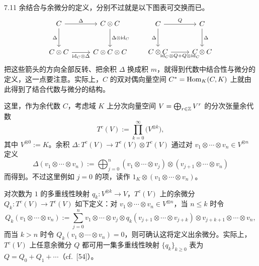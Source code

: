\begin{remark}{7.11}
余结合与余微分的定义，分别不过就是以下图表可交换而已。
\[
\begin{tikzcd}[row sep=2.6em, column sep=2.6em]
  C \arrow[r,"\Delta"] \arrow[d,"\Delta"'] & C\otimes C \arrow[d,"\Delta\otimes\id_{C}"] \\
  C\otimes C \arrow[r,"\id_{C}\otimes\Delta"'] & C\otimes C\otimes C
\end{tikzcd}
\qquad
\begin{tikzcd}[row sep=2.6em, column sep=2.6em]
  C \arrow[r,"Q"] \arrow[d,"\Delta"'] & C \arrow[d,"\Delta"] \\
  C\otimes C \arrow[r,"\id_{C}\otimes Q+Q\otimes\id_{C}"'] & C\otimes C
\end{tikzcd}
\]
把这些箭头的方向全部反转、把余积 $\Delta$ 换成积 $m$，就得到代数中结合性与微分的定义，这一点要注意。实际上，$C$ 的双对偶向量空间 $C^{*}=\operatorname{Hom}_{K}(C,K)$ 上就由此得到了结合代数与微分的结构。
\end{remark}

这里，作为余代数 $C$，考虑域 $K$ 上分次向量空间 $V=\bigoplus_{r\in\mathbb{Z}}V^{r}$ 的分次张量余代数
\[
  T^{c}(V):=\prod_{k=0}^{\infty}\bigl(V^{\otimes k}\bigr),
\]
其中 $V^{\otimes 0}:=K$。余积 $\Delta\colon T^{c}(V)\to T^{c}(V)\otimes T^{c}(V)$ 通过对 $v_{1}\otimes\cdots\otimes v_{n}\in V^{\otimes n}$ 定义
\[
  \Delta(v_{1}\otimes\cdots\otimes v_{n}):=\bigoplus_{j=0}^{n}(v_{1}\otimes\cdots\otimes v_{j})\otimes(v_{j+1}\otimes\cdots\otimes v_{n})
\]
而得到。不过这里例如 $j=0$ 的项，读作 $1_{K}\otimes(v_{1}\otimes\cdots\otimes v_{n})$。

对次数为 $1$ 的多重线性映射 $q_{k}\colon V^{\otimes k}\to V$，$T^{c}(V)$ 上的余微分 $Q_{k}\colon T^{c}(V)\to T^{c}(V)$ 如下定义：对 $v_{1}\otimes\cdots\otimes v_{n}\in V^{\otimes n}$，当 $n\le k$ 时令
\[
  Q_{k}(v_{1}\otimes\cdots\otimes v_{n}):=\sum_{j=0}^{n}v_{1}\otimes\cdots\otimes v_{j}\otimes q_{k}(v_{j+1}\otimes\cdots\otimes v_{j+k})\otimes v_{j+k+1}\otimes\cdots\otimes v_{n},
\]
而当 $k>n$ 时令 $Q_{k}(v_{1}\otimes\cdots\otimes v_{n})=0$，则可确认这将定义出余微分。实际上，$T^{c}(V)$ 上任意余微分 $Q$ 都可用一集多重线性映射 $\{q_{k}\}_{k\ge 0}$ 表为 $Q=Q_{0}+Q_{1}+\cdots$（cf.\ [54]）。


